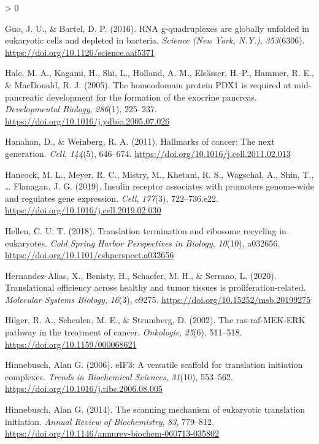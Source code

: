 \documentclass[
  12pt,
  openany]{book}
\newlength{\cslhangindent}
\newenvironment{CSLReferences}[2] %
 {%
  \setlength{\parindent}{0pt}
  \ifodd #1 \everypar{\setlength{\hangindent}{\cslhangindent}}\ignorespaces\fi
  \ifnum #2 > 0
  \setlength{\parskip}{#2\baselineskip}
  \fi
 }%
 {}
\begin{document}
\begin{CSLReferences}{1}{0}
\leavevmode\hypertarget{ref-Guo2016}{}%
Guo, J. U., \& Bartel, D. P. (2016). {RNA} g-quadruplexes are globally unfolded in eukaryotic cells and depleted in bacteria. \emph{Science (New York, N.Y.)}, \emph{353}(6306). \url{https://doi.org/10.1126/science.aaf5371}

\leavevmode\hypertarget{ref-Hale2005}{}%
Hale, M. A., Kagami, H., Shi, L., Holland, A. M., Elsässer, H.-P., Hammer, R. E., \& MacDonald, R. J. (2005). The homeodomain protein {PDX}1 is required at mid-pancreatic development for the formation of the exocrine pancreas. \emph{Developmental Biology}, \emph{286}(1), 225--237. \url{https://doi.org/10.1016/j.ydbio.2005.07.026}

\leavevmode\hypertarget{ref-Hanahan2011}{}%
Hanahan, D., \& Weinberg, R. A. (2011). Hallmarks of cancer: The next generation. \emph{Cell}, \emph{144}(5), 646--674. \url{https://doi.org/10.1016/j.cell.2011.02.013}

\leavevmode\hypertarget{ref-Hancock2019}{}%
Hancock, M. L., Meyer, R. C., Mistry, M., Khetani, R. S., Wagschal, A., Shin, T., \ldots{} Flanagan, J. G. (2019). Insulin receptor associates with promoters genome-wide and regulates gene expression. \emph{Cell}, \emph{177}(3), 722--736.e22. \url{https://doi.org/10.1016/j.cell.2019.02.030}

\leavevmode\hypertarget{ref-Hellen2018}{}%
Hellen, C. U. T. (2018). Translation termination and ribosome recycling in eukaryotes. \emph{Cold Spring Harbor Perspectives in Biology}, \emph{10}(10), a032656. \url{https://doi.org/10.1101/cshperspect.a032656}

\leavevmode\hypertarget{ref-Hernandez-Alias2020}{}%
Hernandez-Alias, X., Benisty, H., Schaefer, M. H., \& Serrano, L. (2020). Translational efficiency across healthy and tumor tissues is proliferation-related. \emph{Molecular Systems Biology}, \emph{16}(3), e9275. \url{https://doi.org/10.15252/msb.20199275}

\leavevmode\hypertarget{ref-Hilger2002}{}%
Hilger, R. A., Scheulen, M. E., \& Strumberg, D. (2002). The ras-raf-{MEK}-{ERK} pathway in the treatment of cancer. \emph{Onkologie}, \emph{25}(6), 511--518. \url{https://doi.org/10.1159/000068621}

\leavevmode\hypertarget{ref-Hinnebusch2006}{}%
Hinnebusch, Alan G. (2006). {eIF}3: A versatile scaffold for translation initiation complexes. \emph{Trends in Biochemical Sciences}, \emph{31}(10), 553--562. \url{https://doi.org/10.1016/j.tibs.2006.08.005}

\leavevmode\hypertarget{ref-Hinnebusch2014}{}%
Hinnebusch, Alan G. (2014). The scanning mechanism of eukaryotic translation initiation. \emph{Annual Review of Biochemistry}, \emph{83}, 779--812. \url{https://doi.org/10.1146/annurev-biochem-060713-035802}


\end{CSLReferences}
\end{document}
